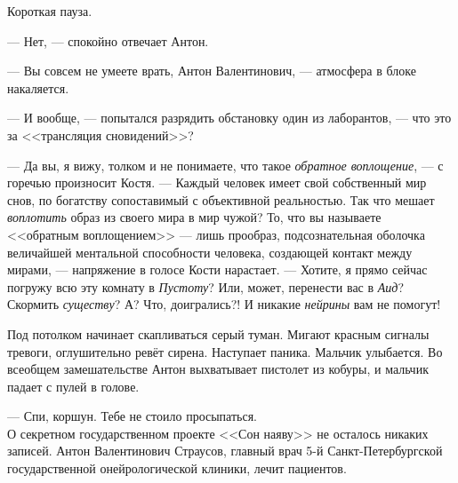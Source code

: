 \documentclass[openany, oneside]{book}
\begin{document}
Короткая пауза.

--- Нет, --- спокойно отвечает Антон.

--- Вы совсем не умеете врать, Антон Валентинович, --- атмосфера в блоке накаляется.

--- И вообще, --- попытался разрядить обстановку один из лаборантов, --- что это за <<трансляция сновидений>>?

--- Да вы, я вижу, толком и не понимаете, что такое \textit{обратное воплощение}, --- с горечью произносит Костя. --- Каждый человек имеет свой собственный мир снов, по богатству сопоставимый с объективной реальностью. Так что мешает \textit{воплотить} образ из своего мира в мир чужой? То, что вы называете <<обратным воплощением>> --- лишь прообраз, подсознательная оболочка величайшей ментальной способности человека, создающей контакт между мирами, --- напряжение в голосе Кости нарастает. --- Хотите, я прямо сейчас погружу всю эту комнату в \textit{Пустоту}? Или, может, перенести вас в \textit{Аид}? Скормить \textit{существу}? А? Что, доигрались?! И никакие \textit{нейрины} вам не помогут!

Под потолком начинает скапливаться серый туман. Мигают красным сигналы тревоги, оглушительно ревёт сирена. Наступает паника. Мальчик улыбается. Во всеобщем замешательстве Антон выхватывает пистолет из кобуры, и мальчик падает с пулей в голове.

--- Спи, коршун. Тебе не стоило просыпаться.\\

О секретном государственном проекте <<Сон наяву>> не осталось никаких записей. Антон Валентинович Страусов, главный врач 5-й Санкт-Петербургской государственной онейрологической клиники, лечит пациентов.
\end{document}
